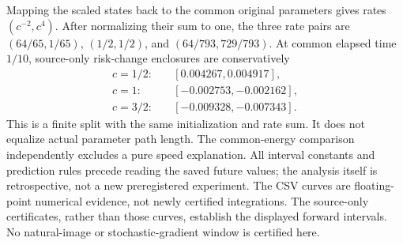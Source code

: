 Mapping the scaled states back to the common original parameters gives rates $(c^{-2},c^4)$. After normalizing their sum to one, the three rate pairs are $(64/65,1/65)$, $(1/2,1/2)$, and $(64/793,729/793)$. At common elapsed time $1/10$, source-only risk-change enclosures are conservatively
\begin{align}
 c=1/2:&\quad[0.004267,0.004917],\nonumber\\
 c=1:&\quad[-0.002753,-0.002162],\\
 c=3/2:&\quad[-0.009328,-0.007343].\nonumber
\end{align}
This is a finite split with the same initialization and rate sum. It does not equalize actual parameter path length. The common-energy comparison independently excludes a pure speed explanation. All interval constants and prediction rules precede reading the saved future values; the analysis itself is retrospective, not a new preregistered experiment. The CSV curves are floating-point numerical evidence, not newly certified integrations. The source-only certificates, rather than those curves, establish the displayed forward intervals. No natural-image or stochastic-gradient window is certified here.
